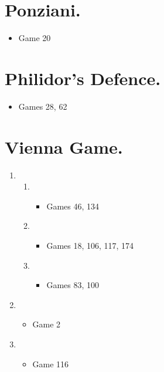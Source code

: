 \begin{multicols}{2}
\section{Ponziani.}
\newgame{}
\begin{itemize}
\item Game 20
\end{itemize}

\section{Philidor's Defence.}
\newgame{}
\begin{itemize}
\item Games 28, 62
\end{itemize}

\section{Vienna Game.}
\newgame{}
\begin{enumerate}
\item {}
\begin{enumerate}
\item {}
\begin{itemize}
\item Games 46, 134
\end{itemize}
\item {}
\begin{itemize}
\item Games 18, 106, 117, 174
\end{itemize}
\item {}
\begin{itemize}
\item Games 83, 100
\end{itemize}
\end{enumerate}
\item {}
\begin{itemize}
\item Game 2
\end{itemize}
\item {}
\begin{itemize}
\item Game 116
\end{itemize}
\end{enumerate}


\end{multicols}
